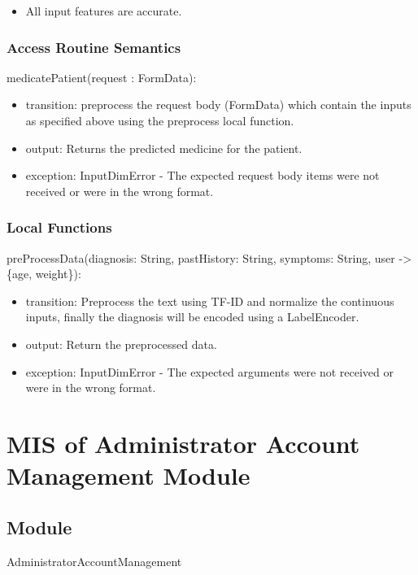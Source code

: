 \documentclass[12pt, titlepage]{article}
\begin{document}
\begin{itemize}
  \item All input features are accurate.
\end{itemize}

\subsubsection{Access Routine Semantics}

\noindent medicatePatient(request : FormData):
\begin{itemize}
\item transition: preprocess the request body (FormData) which contain the inputs as specified above using the preprocess local function. 
\item output: Returns the predicted medicine for the patient.
\item exception: InputDimError - The expected request body items were not received or were in the wrong format.
\end{itemize}

\subsubsection{Local Functions}

\noindent preProcessData(diagnosis: String, pastHistory: String, symptoms: String, user -> \{age, weight\}):
\begin{itemize}
\item transition: Preprocess the text using TF-ID and normalize the continuous inputs, finally the diagnosis will be encoded using a LabelEncoder.
\item output: Return the preprocessed data.
\item exception: InputDimError - The expected arguments were not received or were in the wrong format.
\end{itemize}

\newpage

\section{MIS of Administrator Account Management Module} \label{Module_AdminAccount}

\subsection{Module}
AdministratorAccountManagement
\end{document}
